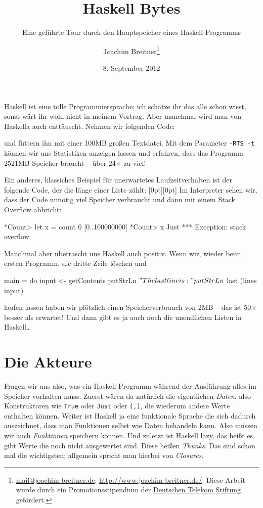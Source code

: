 \documentclass[11pt,DIV=12,parskip=half,headings=normal,abstract]{scrartcl}
\author{Joachim Breitner\footnote{\href{mailto:mail@joachim-breitner.de}{mail@joachim-breitner.de}, \url{http://www.joachim-breitner.de/}. Diese Arbeit wurde durch ein Promotionsstipendium der \href{http://telekom-stiftung.de/}{Deutschen Telekom Stiftung} gefördert.}}
\title{Haskell Bytes}
\subtitle{Eine geführte Tour durch den Hauptspeicher eines Haskell-Programms}
\date{8. September 2012}
\newcommand{\mylabel}[1]{\raisebox{2em}[0pt][0pt]{\makebox[0pt][l]{\makebox[\linewidth][r]{\color{gray}{\sffamily #1}\hspace{2em}}}}\ignorespaces}
\newcommand{\li}{\lstinline[style=haskell]}
\begin{document}
\maketitle

Haskell ist eine tolle Programmiersprache; ich schätze ihr das alle schon wisst, sonst wärt ihr wohl nicht in meinem Vortrag. Aber manchmal wird man von Haskella auch enttäuscht. Nehmen wir folgenden Code:
und füttern ihn mit einer 100MB großen Textdatei. Mit dem Parameter \texttt{-RTS -t} können wir uns Statistiken anzeigen lassen und erfahren, dass das Programm 2521MB Speicher braucht – über 24$\times$ zu viel!

Ein anderes, klassiches Beispiel für unerwartetes Laufzeitverhalten ist der folgende Code, der die länge einer Liste zählt:
\mylabel{Haskell}
Im Interpreter sehen wir, dass der Code unnötig viel Speicher verbraucht und dann mit einem Stack Overflow abbricht:
\begin{ghci}
*Count> let x = count 0 [0..100000000]
*Count> x
Just *** Exception: stack overflow
\end{ghci}

Manchmal aber überrascht uns Haskell auch positiv. Wenn wir, wieder beim ersten Programm, die dritte Zeile löschen und
\begin{haskell}
main = do
    input <- getContents
    putStrLn $ "The last line is:"
    putStrLn $ last (lines input)
\end{haskell}
laufen lassen haben wir plötzlich einen Speicherverbrauch von 2MB – das ist 50$\times$ besser als erwartet! Und dann gibt es ja auch noch die unendlichen Listen in Haskell\dots

\section{Die Akteure}

Fragen wir uns also, was ein Haskell-Programm während der Ausführung alles im Speicher vorhalten muss. Zuerst wären da natürlich die eigentlichen \emph{Daten}, also Konstruktoren wie \li-True- oder \li-Just- oder \li-(,)-, die wiederum andere Werte enthalten können. Weiter ist Haskell ja eine funktionale Sprache die sich dadurch auszeichnet, dass man Funktionen selbst wie Daten behandeln kann. Also müssen wir auch \emph{Funktionen} speichern können. Und zuletzt ist Haskell lazy, das heißt es gibt Werte die noch nicht ausgewertet sind. Diese heißen \emph{Thunks}. Das sind schon mal die wichtigsten; allgemein spricht man hierbei von \emph{Closures}.
\end{document}
